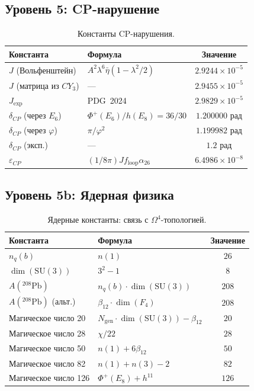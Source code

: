 \documentclass[11pt,a4paper]{article}
\newcommand{\SU}{\ensuremath{\mathrm{SU}}}
\newcommand{\CY}{\ensuremath{CY_3}}
\newcommand{\Om}{\ensuremath{\Omega^4}}
\newcommand{\Ngen}{\ensuremath{N_{\text{gen}}}}
\theoremstyle{definition}
\begin{document}
\subsection{Уровень 5: CP-нарушение}
\label{app:level-5-cp}

\begin{table}[ht]
\centering
\caption{Константы CP-нарушения.}
\label{tab:app-cp}
\begin{tabular}{llc}
\toprule
Константа & Формула & Значение \\
\midrule
$J$ (Вольфенштейн) & $A^2 \lambda^6 \bar{\eta} (1 - \lambda^2/2)$ & $2.9244 \times 10^{-5}$ \\
$J$ (матрица из $\CY$) & — & $2.9455 \times 10^{-5}$ \\
$J_{\text{exp}}$ & PDG~2024 & $2.9829 \times 10^{-5}$ \\
$\delta_{CP}$ (через $E_6$) & $\Phi^+(E_6)/h(E_8) = 36/30$ & $1.200000$ рад \\
$\delta_{CP}$ (через $\varphi$) & $\pi/\varphi^2$ & $1.199982$ рад \\
$\delta_{CP}$ (эксп.) & — & $1.2$ рад \\
$\varepsilon_{CP}$ & $(1/8\pi) J f_{\text{loop}} \alpha_{26}$ & $6.4986 \times 10^{-8}$ \\
\bottomrule
\end{tabular}
\end{table}

\subsection{Уровень 5b: Ядерная физика}
\label{app:level-5b-nuclear}

\begin{table}[ht]
\centering
\caption{Ядерные константы: связь с $\Om$-топологией.}
\label{tab:app-nuclear}
\begin{tabular}{llc}
\toprule
Константа & Формула & Значение \\
\midrule
$n_q(b)$ & $n(1)$ & $26$ \\
$\dim(\SU(3))$ & $3^2 - 1$ & $8$ \\
$A(^{208}\text{Pb})$ & $n_q(b) \cdot \dim(\SU(3))$ & $208$ \\
$A(^{208}\text{Pb})$ (альт.) & $\beta_{12} \cdot \dim(F_4)$ & $208$ \\
\midrule
Магическое число 20  & $\Ngen \cdot \dim(\SU(3)) - \beta_{12}$ & $20$ \\
Магическое число 28  & $\chi/22$ & $28$ \\
Магическое число 50  & $n(1) + 6\beta_{12}$ & $50$ \\
Магическое число 82  & $n(1) + n(3) - 2$ & $82$ \\
Магическое число 126 & $\Phi^+(E_8) + h^{11}$ & $126$ \\
\bottomrule
\end{tabular}
\end{table}
\end{document}
